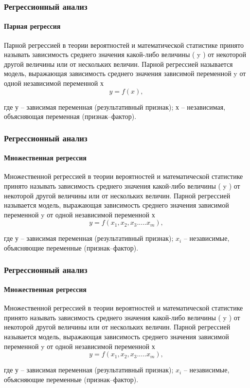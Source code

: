 \documentclass[10pt,pdf,hyperref={unicode}]{beamer}
\begin{document}
\begin{frame}
\frametitle{Регрессионный анализ} 
\framesubtitle{Парная регрессия}

Парной регрессией в теории вероятностей и математической статистике принято
называть зависимость среднего значения какой-либо величины ( y ) от некоторой
другой величины или от нескольких величин.
Парной регрессией называется модель, выражающая зависимость 
среднего значения зависимой переменной y 
от одной независимой переменной х
$$ y= f(x) ,$$

где у – зависимая переменная (результативный признак); х – независимая,
объясняющая переменная (признак–фактор).

\end{frame}

\begin{frame}
\frametitle{Регрессионный анализ} 
\framesubtitle{Множественная регрессия}

Множественной регрессией в теории вероятностей и математической статистике принято
называть зависимость среднего значения какой-либо величины ( y ) от некоторой
другой величины или от нескольких величин.
Парной регрессией называется модель, выражающая зависимость 
среднего значения зависимой переменной y 
от одной независимой переменной х
$$ y= f(x_1,x_2, x_3 .....x_m) ,$$

где у – зависимая переменная (результативный признак); $x_i$ – независимые,
объясняющие переменные (признак–фактор).

\end{frame}

\begin{frame}
\frametitle{Регрессионный анализ} 
\framesubtitle{Множественная регрессия}

Множественной регрессией в теории вероятностей и математической статистике принято
называть зависимость среднего значения какой-либо величины ( y ) от некоторой
другой величины или от нескольких величин.
Парной регрессией называется модель, выражающая зависимость 
среднего значения зависимой переменной y 
от одной независимой переменной х
$$ y= f(x_1,x_2, x_3 .....x_m) ,$$

где у – зависимая переменная (результативный признак); $x_i$ – независимые,
объясняющие переменные (признак–фактор).

\end{frame}
\end{document}
